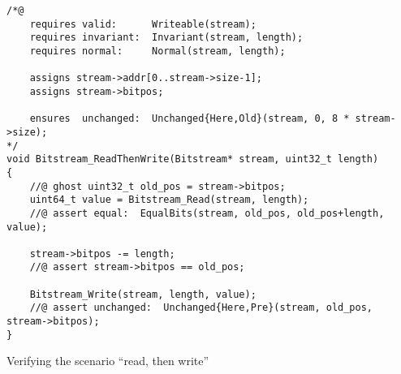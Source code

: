 \begin{listing}[hbt]
\begin{minipage}{0.99\textwidth}
\begin{lstlisting}[style=acsl-block]
/*@
    requires valid:      Writeable(stream);
    requires invariant:  Invariant(stream, length);
    requires normal:     Normal(stream, length);

    assigns stream->addr[0..stream->size-1];
    assigns stream->bitpos;

    ensures  unchanged:  Unchanged{Here,Old}(stream, 0, 8 * stream->size);
*/
void Bitstream_ReadThenWrite(Bitstream* stream, uint32_t length)
{
    //@ ghost uint32_t old_pos = stream->bitpos;
    uint64_t value = Bitstream_Read(stream, length);
    //@ assert equal:  EqualBits(stream, old_pos, old_pos+length, value);

    stream->bitpos -= length;
    //@ assert stream->bitpos == old_pos;

    Bitstream_Write(stream, length, value);
    //@ assert unchanged:  Unchanged{Here,Pre}(stream, old_pos, stream->bitpos);
}
\end{lstlisting}
\end{minipage}
\caption{\label{lst:Bitstream_ReadThenWrite}
	Verifying the scenario ``read, then write'' }
\end{listing}

